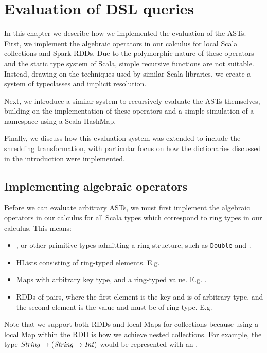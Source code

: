 \chapter{Evaluation of DSL queries}

In this chapter we describe how we implemented the evaluation of the ASTs. First, we implement the algebraic operators in our calculus for local Scala collections and Spark RDDs. Due to the polymorphic nature of these operators and the static type system of Scala, simple recursive functions are not suitable. Instead, drawing on the techniques used by similar Scala libraries, we create a system of typeclasses and implicit resolution.

Next, we introduce a similar system to recursively evaluate the ASTs themselves, building on the implementation of these operators and a simple simulation of a namespace using a Scala HashMap. 

Finally, we discuss how this evaluation system was extended to include the shredding transformation, with particular focus on how the dictionaries discussed in the introduction were implemented.

\section{Implementing algebraic operators}

Before we can evaluate arbitrary ASTs, we must first implement the algebraic operators in our calculus for all Scala types which correspond to ring types in our calculus. This means:
\begin{itemize}
\item{, or other primitive types admitting a ring structure, such as \lstinline|Double| and .}
\item{HLists consisting of ring-typed elements. E.g. \vs {}} 
\item{Maps with arbitrary key type, and a ring-typed value.
E.g. .}
\item{RDDs of pairs, where the first element is the key and is of arbitrary type, and the second element is the value and must be of ring type. E.g. \lin{RDD[(String,Int::Boolean::HNil)}}
\end{itemize}

Note that we support both RDDs and local Maps for collections because using a local Map within the RDD is how we achieve nested collections. For example, the type $\textrm{\textit{String}} \rightarrow (\textrm{\textit{String}} \rightarrow \textrm{\textit{Int}})$ would be represented with an .

